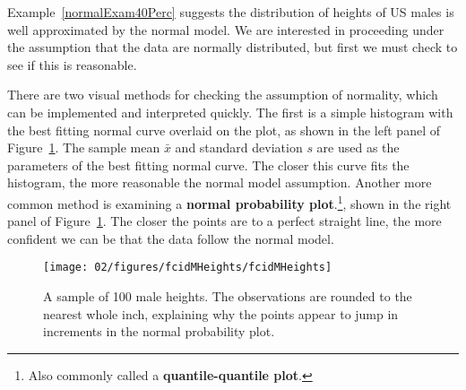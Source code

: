 Example~\ref{normalExam40Perc} suggests the distribution of heights of US males is well approximated by the normal model. We are interested in proceeding under the assumption that the data are normally distributed, but first we must check to see if this is reasonable.

There are two visual methods for checking the assumption of normality, which can be implemented and interpreted quickly. The first is a simple histogram with the best fitting normal curve overlaid on the plot, as shown in the left panel of Figure~\ref{fcidMHeights}. The sample mean $\bar{x}$ and standard deviation $s$ are used as the parameters of the best fitting normal curve. The closer this curve fits the histogram, the more reasonable the normal model assumption. Another more common method is examining a \textbf{normal probability plot}.\footnote{Also commonly called a \textbf{quantile-quantile plot}.}, shown in the right panel of Figure~\ref{fcidMHeights}. The closer the points are to a perfect straight line, the more confident we can be that the data follow the normal model.

\begin{figure}
\centering
\texttt{[image: 02/figures/fcidMHeights/fcidMHeights]}
\caption{A sample of 100 male heights. The observations are rounded to the nearest whole inch, explaining why the points appear to jump in increments in the normal probability plot.}
\label{fcidMHeights}
\end{figure}


